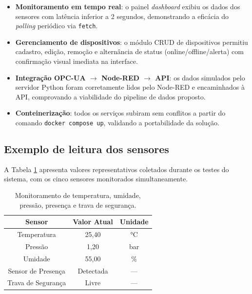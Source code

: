 \documentclass[12pt]{unisenaiclass}
\begin{document}
\begin{itemize}
    \item \textbf{Monitoramento em tempo real}: o painel \textit{dashboard} exibiu os dados
    dos sensores com latência inferior a 2 segundos, demonstrando a eficácia do
    \textit{polling} periódico via \texttt{fetch}.

    \item \textbf{Gerenciamento de dispositivos}: o módulo CRUD de dispositivos permitiu
    cadastro, edição, remoção e alternância de status (online/offline/alerta) com
    confirmação visual imediata na interface.

    \item \textbf{Integração OPC-UA $\rightarrow$ Node-RED $\rightarrow$ API}: os dados
    simulados pelo servidor Python foram corretamente lidos pelo Node-RED e encaminhados
    à API, comprovando a viabilidade do pipeline de dados proposto.

    \item \textbf{Conteinerização}: todos os serviços subiram sem conflitos a partir do
    comando \texttt{docker compose up}, validando a portabilidade da solução.
\end{itemize}

\subsection{Exemplo de leitura dos sensores}

A Tabela \ref{tab:sensores} apresenta valores representativos coletados durante os testes
do sistema, com os cinco sensores monitorados simultaneamente.

\begin{table}[H]
\centering
\caption{Monitoramento de temperatura, umidade, pressão, presença e trava de segurança.}
\label{tab:sensores}
\begin{tabular}{|c|c|c|}
\hline
\textbf{Sensor}     & \textbf{Valor Atual} & \textbf{Unidade} \\ \hline
Temperatura         & 25,40                & °C               \\ \hline
Pressão             & 1,20                 & bar              \\ \hline
Umidade             & 55,00                & \%               \\ \hline
Sensor de Presença  & Detectada            & —                \\ \hline
Trava de Segurança  & Livre                & —                \\ \hline
\end{tabular}
\end{table}
\end{document}
